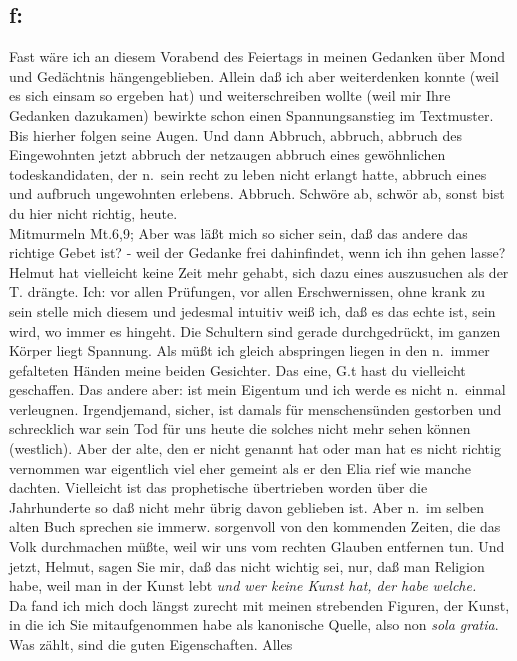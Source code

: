 \documentclass[
]{article}
\author{}
\date{\vspace{-2.5em}}
\begin{document}
\subsection{f:}\label{f}

Fast wäre ich an diesem Vorabend des Feiertags in meinen Gedanken über
Mond und Gedächtnis hängengeblieben. Allein daß ich aber weiterdenken
konnte (weil es sich einsam so ergeben hat) und weiterschreiben wollte
(weil mir Ihre Gedanken dazukamen) bewirkte schon einen Spannungsanstieg
im Textmuster. Bis hierher folgen seine Augen. Und dann Abbruch,
abbruch, abbruch des Eingewohnten jetzt abbruch der netzaugen abbruch
eines gewöhnlichen todeskandidaten, der n.~sein recht zu leben nicht
erlangt hatte, abbruch eines und aufbruch ungewohnten erlebens. Abbruch.
Schwöre ab, schwör ab, sonst bist du hier nicht richtig, heute.\\
Mitmurmeln Mt.6,9; Aber was läßt mich so sicher sein, daß das andere das
richtige Gebet ist? - weil der Gedanke frei dahinfindet, wenn ich ihn
gehen lasse? Helmut hat vielleicht keine Zeit mehr gehabt, sich dazu
eines auszusuchen als der T. drängte. Ich: vor allen Prüfungen, vor
allen Erschwernissen, ohne krank zu sein stelle mich diesem und jedesmal
intuitiv weiß ich, daß es das echte ist, sein wird, wo immer es hingeht.
Die Schultern sind gerade durchgedrückt, im ganzen Körper liegt
Spannung. Als müßt ich gleich abspringen liegen in den n.~immer
gefalteten Händen meine beiden Gesichter. Das eine, G.t hast du
vielleicht geschaffen. Das andere aber: ist mein Eigentum und ich werde
es nicht n.~einmal verleugnen. Irgendjemand, sicher, ist damals für
menschensünden gestorben und schrecklich war sein Tod für uns heute die
solches nicht mehr sehen können (westlich). Aber der alte, den er nicht
genannt hat oder man hat es nicht richtig vernommen war eigentlich viel
eher gemeint als er den Elia rief wie manche dachten. Vielleicht ist das
prophetische übertrieben worden über die Jahrhunderte so daß nicht mehr
übrig davon geblieben ist. Aber n.~im selben alten Buch sprechen sie
immerw. sorgenvoll von den kommenden Zeiten, die das Volk durchmachen
müßte, weil wir uns vom rechten Glauben entfernen tun. Und jetzt,
Helmut, sagen Sie mir, daß das nicht wichtig sei, nur, daß man Religion
habe, weil man in der Kunst lebt \emph{und wer keine Kunst hat, der habe
welche.}\\
Da fand ich mich doch längst zurecht mit meinen strebenden Figuren, der
Kunst, in die ich Sie mitaufgenommen habe als kanonische Quelle, also
non \emph{sola gratia}. Was zählt, sind die guten Eigenschaften. Alles
\end{document}
